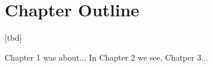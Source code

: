 




\section{Chapter Outline}

[tbd]


Chapter 1 was about...
In Chapter 2 we see,
Chatper 3...













